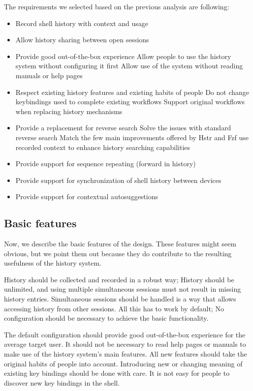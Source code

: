The requirements we selected based on the previous analysis are following:

\begin{itemize}
\item Record shell history with context and usage
\item Allow history sharing between open sessions
\item Provide good out-of-the-box experience
\subitem Allow people to use the history system without configuring it first
\subitem Allow use of the system without reading manuals or help pages
\item Respect existing history features and existing habits of people
\subitem Do not change keybindings used to complete existing workflows
\subitem Support original workflows when replacing history mechanisms
\item Provide a replacement for reverse search
\subitem Solve the issues with standard reverse search
\subitem Match the few main improvements offered by Hstr and Fzf
\subitem use recorded context to enhance history searching capabilities
\item Provide support for sequence repeating (forward in history)
\item Provide support for synchronization of shell history between devices
\item Provide support for contextual autosuggestions
\end{itemize}



\subsection{Basic features}

Now, we describe the basic features of the design. These features might seem obvious, but we point them out because they do contribute to the resulting usefulness of the history system.

History should be collected and recorded in a robust way; History should be unlimited, and using multiple simultaneous sessions must not result in missing history entries. 
Simultaneous sessions should be handled is a way that allows accessing history from other sessions.
All this has to work by default; No configuration should be necessary to achieve the basic functionality. 

The default configuration should provide good out-of-the-box experience for the average target user. It should not be necessary to read help pages or manuals to make use of the history system's main features. 
All new features should take the original habits of people into account. 
Introducing new or changing meaning of existing key bindings should be done with care. It is not easy for people to discover new key bindings in the shell.


